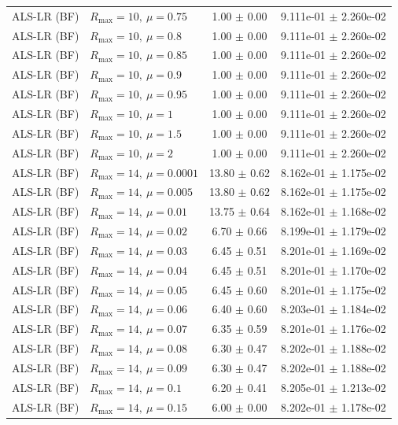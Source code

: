 \begin{table}[t]
\begin{tabular}{@{}llcc@{}}
ALS-LR (BF) & \(R_{\max}=10,\ \mu=0.75\) & 1.00 $\pm$ 0.00 & 9.111e-01 $\pm$ 2.260e-02 \\
ALS-LR (BF) & \(R_{\max}=10,\ \mu=0.8\) & 1.00 $\pm$ 0.00 & 9.111e-01 $\pm$ 2.260e-02 \\
ALS-LR (BF) & \(R_{\max}=10,\ \mu=0.85\) & 1.00 $\pm$ 0.00 & 9.111e-01 $\pm$ 2.260e-02 \\
ALS-LR (BF) & \(R_{\max}=10,\ \mu=0.9\) & 1.00 $\pm$ 0.00 & 9.111e-01 $\pm$ 2.260e-02 \\
ALS-LR (BF) & \(R_{\max}=10,\ \mu=0.95\) & 1.00 $\pm$ 0.00 & 9.111e-01 $\pm$ 2.260e-02 \\
ALS-LR (BF) & \(R_{\max}=10,\ \mu=1\) & 1.00 $\pm$ 0.00 & 9.111e-01 $\pm$ 2.260e-02 \\
ALS-LR (BF) & \(R_{\max}=10,\ \mu=1.5\) & 1.00 $\pm$ 0.00 & 9.111e-01 $\pm$ 2.260e-02 \\
ALS-LR (BF) & \(R_{\max}=10,\ \mu=2\) & 1.00 $\pm$ 0.00 & 9.111e-01 $\pm$ 2.260e-02 \\
ALS-LR (BF) & \(R_{\max}=14,\ \mu=0.0001\) & 13.80 $\pm$ 0.62 & 8.162e-01 $\pm$ 1.175e-02 \\
ALS-LR (BF) & \(R_{\max}=14,\ \mu=0.005\) & 13.80 $\pm$ 0.62 & 8.162e-01 $\pm$ 1.175e-02 \\
ALS-LR (BF) & \(R_{\max}=14,\ \mu=0.01\) & 13.75 $\pm$ 0.64 & 8.162e-01 $\pm$ 1.168e-02 \\
ALS-LR (BF) & \(R_{\max}=14,\ \mu=0.02\) & 6.70 $\pm$ 0.66 & 8.199e-01 $\pm$ 1.179e-02 \\
ALS-LR (BF) & \(R_{\max}=14,\ \mu=0.03\) & 6.45 $\pm$ 0.51 & 8.201e-01 $\pm$ 1.169e-02 \\
ALS-LR (BF) & \(R_{\max}=14,\ \mu=0.04\) & 6.45 $\pm$ 0.51 & 8.201e-01 $\pm$ 1.170e-02 \\
ALS-LR (BF) & \(R_{\max}=14,\ \mu=0.05\) & 6.45 $\pm$ 0.60 & 8.201e-01 $\pm$ 1.175e-02 \\
ALS-LR (BF) & \(R_{\max}=14,\ \mu=0.06\) & 6.40 $\pm$ 0.60 & 8.203e-01 $\pm$ 1.184e-02 \\
ALS-LR (BF) & \(R_{\max}=14,\ \mu=0.07\) & 6.35 $\pm$ 0.59 & 8.201e-01 $\pm$ 1.176e-02 \\
ALS-LR (BF) & \(R_{\max}=14,\ \mu=0.08\) & 6.30 $\pm$ 0.47 & 8.202e-01 $\pm$ 1.188e-02 \\
ALS-LR (BF) & \(R_{\max}=14,\ \mu=0.09\) & 6.30 $\pm$ 0.47 & 8.202e-01 $\pm$ 1.188e-02 \\
ALS-LR (BF) & \(R_{\max}=14,\ \mu=0.1\) & 6.20 $\pm$ 0.41 & 8.205e-01 $\pm$ 1.213e-02 \\
ALS-LR (BF) & \(R_{\max}=14,\ \mu=0.15\) & 6.00 $\pm$ 0.00 & 8.202e-01 $\pm$ 1.178e-02 \\

\end{tabular}
\end{table}
